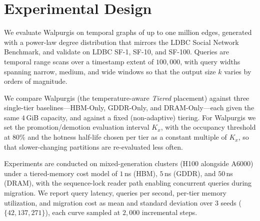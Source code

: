 \documentclass{article}
\begin{document}
\section{Experimental Design}
\label{sec:experimental_design}

We evaluate Walpurgis on temporal graphs of up to one million edges, generated with a
power-law degree distribution that mirrors the LDBC Social Network Benchmark, and
validate on LDBC SF-1, SF-10, and SF-100. Queries are temporal range scans over a
timestamp extent of $100{,}000$, with query widths spanning narrow, medium, and wide
windows so that the output size $k$ varies by orders of magnitude.

We compare Walpurgis (the temperature-aware \emph{Tiered} placement) against three
single-tier baselines---HBM-Only, GDDR-Only, and DRAM-Only---each given the same
$4$\,GiB capacity, and against a fixed (non-adaptive) tiering. For Walpurgis we set the
promotion/demotion evaluation interval $K_x$, with the occupancy threshold at $80\%$
and the hotness half-life chosen per tier as a constant multiple of $K_x$, so that
slower-changing partitions are re-evaluated less often.

Experiments are conducted on mixed-generation clusters (H100 alongside A6000) under a
tiered-memory cost model of $1$\,ns (HBM), $5$\,ns (GDDR), and $50$\,ns (DRAM), with
the sequence-lock reader path enabling concurrent queries during migration. We report
query latency, queries per second, per-tier memory utilization, and migration cost as
mean and standard deviation over $3$ seeds ($\{42, 137, 271\}$), each curve sampled at
$2{,}000$ incremental steps.
\end{document}
